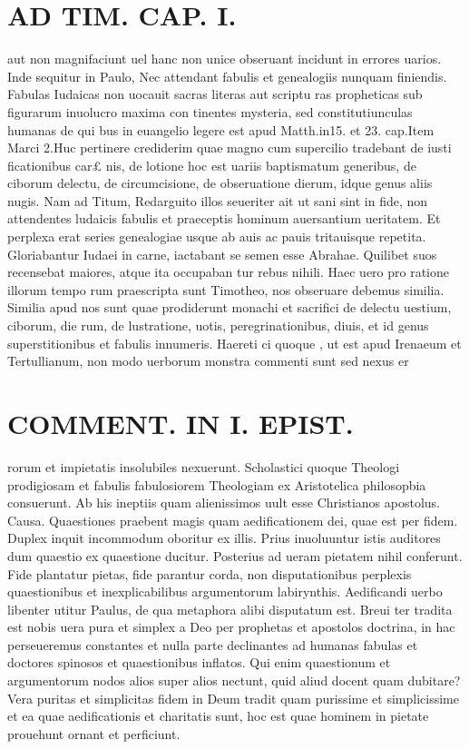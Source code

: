 \documentclass{article}
\begin{document}
\begin{pages}
\section*{AD TIM. CAP. I. }
\marginpar{[ p.96 ]}\pstart aut non magnifaciunt uel hanc non unice obseruant incidunt in errores uarios. Inde sequitur in Paulo, Nec attendant fabulis et genealogiis nunquam finiendis. Fabulas Iudaicas non uocauit sacras literas aut scriptu ras propheticas sub figurarum inuolucro maxima con tinentes mysteria, sed constitutiunculas humanas de qui bus in euangelio legere est apud Matth.in15. et 23. cap.Item Marci 2.Huc pertinere crediderim quae magno cum supercilio tradebant de iusti ficationibus car£ nis, de lotione hoc est uariis baptismatum generibus, de ciborum delectu, de circumcisione, de obseruatione dierum, idque genus aliis nugis. Nam ad Titum, Redarguito illos seueriter ait ut sani sint in fide, non attendentes ludaicis fabulis et praeceptis hominum auersantium ueritatem. Et perplexa erat series genealogiae usque ab auis ac pauis tritauisque repetita. Gloriabantur Iudaei in carne, iactabant se semen esse Abrahae. Quilibet suos recensebat maiores, atque ita occupaban tur rebus nihili. Haec uero pro ratione illorum tempo rum praescripta sunt Timotheo, nos obseruare debemus similia. Similia apud nos sunt quae prodiderunt monachi et sacrifici de delectu uestium, ciborum, die rum, de lustratione, uotis, peregrinationibus, diuis, et id genus superstitionibus et fabulis innumeris. Haereti ci quoque , ut est apud Irenaeum et Tertullianum, non modo uerborum monstra commenti sunt sed nexus er  \pend
\section*{COMMENT. IN I. EPIST. }\pstart rorum et impietatis insolubiles nexuerunt. Scholastici quoque Theologi prodigiosam et fabulis fabulosiorem Theologiam ex Aristotelica philosopbia consuerunt. Ab his ineptiis quam alienissimos uult esse Christianos apostolus. Causa. Quaestiones praebent magis quam aedificationem dei, quae est per fidem. Duplex inquit incommodum oboritur ex illis. Prius inuoluuntur istis auditores dum quaestio ex quaestione ducitur. Posterius ad ueram pietatem nihil conferunt. Fide plantatur pietas, fide parantur corda, non disputationibus perplexis quaestionibus et inexplicabilibus argumentorum labirynthis. Aedificandi uerbo libenter utitur Paulus, de qua metaphora alibi disputatum est. Breui ter tradita est nobis uera pura et simplex a Deo per prophetas et apostolos doctrina, in hac perseueremus constantes et nulla parte declinantes ad humanas fabulas et doctores spinosos et quaestionibus inflatos. Qui enim quaestionum et argumentorum nodos alios super alios nectunt, quid aliud docent quam dubitare? Vera puritas et simplicitas fidem in Deum tradit quam purissime et simplicissime et ea quae aedificationis et charitatis sunt, hoc est quae hominem in pietate prouehunt ornant et perficiunt.  \pend
{}
{}

\end{pages}
\end{document}
